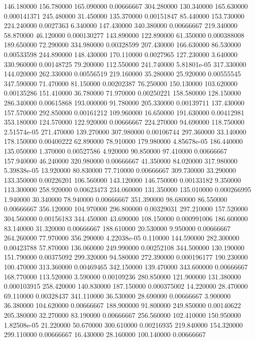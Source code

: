146.180000	156.780000	165.090000	0.00666667
304.280000	130.340000	165.630000	0.000141371
245.480000	31.450000	135.370000	0.00151847
85.440000	153.730000	224.240000	0.0027363
6.340000	147.430000	340.380000	0.00666667
219.340000	58.870000	46.120000	0.000130277
143.890000	122.890000	61.350000	0.000388008
189.650000	72.290000	334.980000	0.00328599
207.430000	166.630000	86.530000	0.00533598
244.890000	148.430000	170.110000	0.0027965
127.230000	3.640000	330.960000	0.00148725
79.200000	112.550000	241.740000	5.81801e-05
317.330000	144.020000	262.330000	0.00556519
219.160000	35.280000	25.920000	0.00555545
347.590000	71.470000	81.150000	0.00202387
76.250000	150.130000	103.620000	0.00135286
151.410000	36.780000	71.970000	0.00250221
158.580000	128.150000	286.340000	0.00615868
193.000000	91.780000	205.330000	0.00139711
137.430000	157.570000	292.850000	0.00161212
109.960000	16.650000	191.630000	0.00412981
353.180000	124.570000	122.920000	0.00666667
224.270000	94.690000	118.750000	2.51574e-05
271.470000	139.270000	307.980000	0.00106744
297.360000	33.140000	178.150000	0.00400222
62.890000	78.910000	179.980000	4.85678e-05
186.440000	135.050000	1.370000	0.00527586
4.920000	90.850000	97.410000	0.00666667
157.940000	46.240000	320.980000	0.00666667
41.350000	84.020000	317.980000	5.39838e-05
13.920000	80.830000	77.710000	0.00666667
309.730000	33.290000	133.350000	0.00226201
106.560000	143.120000	146.750000	0.00133182
9.350000	113.300000	258.920000	0.00623473
234.060000	131.350000	135.010000	0.000266995
1.940000	30.340000	78.940000	0.00666667
351.390000	98.680000	86.550000	0.00666667
356.120000	104.970000	296.800000	0.00329031
297.210000	157.520000	304.560000	0.00156183
344.450000	43.690000	108.150000	0.000991006
186.600000	83.140000	31.320000	0.00666667
188.610000	20.530000	9.950000	0.00666667
264.260000	77.970000	356.290000	4.22038e-05
0.110000	144.590000	282.300000	0.00423788
57.870000	136.060000	249.990000	0.00252108
344.500000	130.190000	151.790000	0.00375092
299.320000	94.580000	272.390000	0.000196177
190.230000	100.470000	313.360000	0.00469465
342.150000	139.470000	343.600000	0.00666667
168.770000	113.520000	3.590000	0.00109236
280.850000	121.900000	131.380000	0.000103915
258.420000	140.830000	187.150000	0.000375002
14.220000	28.470000	69.110000	0.00328437
341.110000	36.530000	28.690000	0.00666667
3.900000	36.380000	104.620000	0.00666667
188.900000	91.800000	249.850000	0.00140622
205.380000	32.270000	83.190000	0.00666667
256.560000	102.410000	150.950000	1.82508e-05
21.220000	50.670000	300.610000	0.00216935
219.840000	154.320000	299.110000	0.00666667
16.430000	28.160000	100.140000	0.00666667
